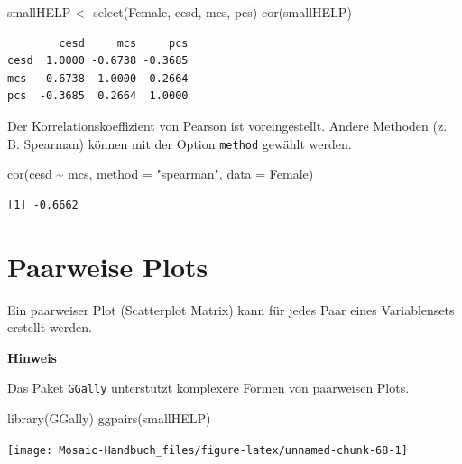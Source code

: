 \documentclass[
  ngerman,
]{scrbook}
\newenvironment{Shaded}{\begin{snugshade}}{\end{snugshade}}
\newcommand{\AttributeTok}[1]{\textcolor[rgb]{0.77,0.63,0.00}{#1}}
\newcommand{\FunctionTok}[1]{\textcolor[rgb]{0.00,0.00,0.00}{#1}}
\newcommand{\NormalTok}[1]{#1}
\newcommand{\OtherTok}[1]{\textcolor[rgb]{0.56,0.35,0.01}{#1}}
\newcommand{\SpecialCharTok}[1]{\textcolor[rgb]{0.00,0.00,0.00}{#1}}
\newcommand{\StringTok}[1]{\textcolor[rgb]{0.31,0.60,0.02}{#1}}
\newenvironment{hinweis}[1]
  {
  \begin{itemize}
  \renewcommand{\labelitemi}{
    \raisebox{1.8\height}[0pt][0pt]{
      {\setkeys{Gin}{width=7em,keepaspectratio}
        {\Large \textcolor{dark-fom-green}\faHandORight}}
        }
  }
  \begin{blackbox}
        \bgroup\color{dark-fom-green}
          {\textbf{Hinweis}}
        \egroup
  \item
  }
  {
  \end{blackbox}
  \end{itemize}
  }
\begin{document}
\begin{Shaded}
\begin{Highlighting}[]
\NormalTok{smallHELP }\OtherTok{\textless{}{-}} \FunctionTok{select}\NormalTok{(Female, cesd, mcs, pcs)}
\FunctionTok{cor}\NormalTok{(smallHELP)}
\end{Highlighting}
\end{Shaded}

\begin{verbatim}
        cesd     mcs     pcs
cesd  1.0000 -0.6738 -0.3685
mcs  -0.6738  1.0000  0.2664
pcs  -0.3685  0.2664  1.0000
\end{verbatim}

Der Korrelationskoeffizient von Pearson ist voreingestellt. Andere Methoden (z. B. Spearman) können mit der Option \texttt{method} gewählt werden.

\begin{Shaded}
\begin{Highlighting}[]
\FunctionTok{cor}\NormalTok{(cesd }\SpecialCharTok{\textasciitilde{}}\NormalTok{ mcs, }\AttributeTok{method =} \StringTok{"spearman"}\NormalTok{, }\AttributeTok{data =}\NormalTok{ Female)}
\end{Highlighting}
\end{Shaded}

\begin{verbatim}
[1] -0.6662
\end{verbatim}

\hypertarget{paarweise-plots}{%
\section{Paarweise Plots}\label{paarweise-plots}}

Ein paarweiser Plot (Scatterplot Matrix) kann für jedes Paar eines Variablensets erstellt werden.

\begin{hinweis}{hinweis}
Das Paket \texttt{GGally} unterstützt komplexere Formen von paarweisen Plots.

\end{hinweis}

\begin{Shaded}
\begin{Highlighting}[]
\FunctionTok{library}\NormalTok{(GGally)}
\FunctionTok{ggpairs}\NormalTok{(smallHELP)}
\end{Highlighting}
\end{Shaded}

\begin{center}\texttt{[image: Mosaic-Handbuch\_files/figure-latex/unnamed-chunk-68-1]} \end{center}
\end{document}
